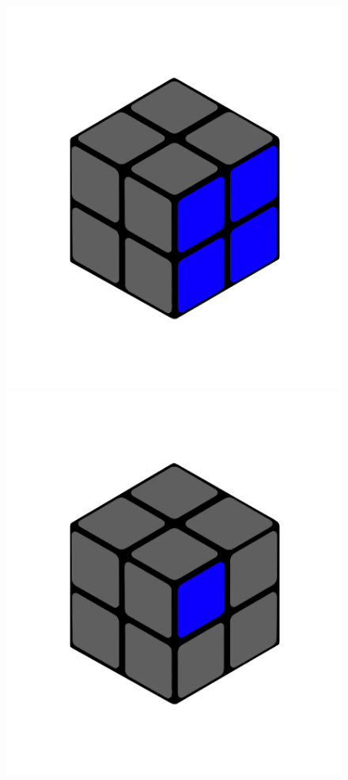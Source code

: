 \documentclass[12pt,a4paper, usenames, dvipsnames]{scrartcl}
\begin{document}
\begin{figure}[h]
\includegraphics[scale=0.04]{2x2seite.png}
\includegraphics[scale=0.04]{2x2farbflaeche.png}

\end{figure}
\end{document}
